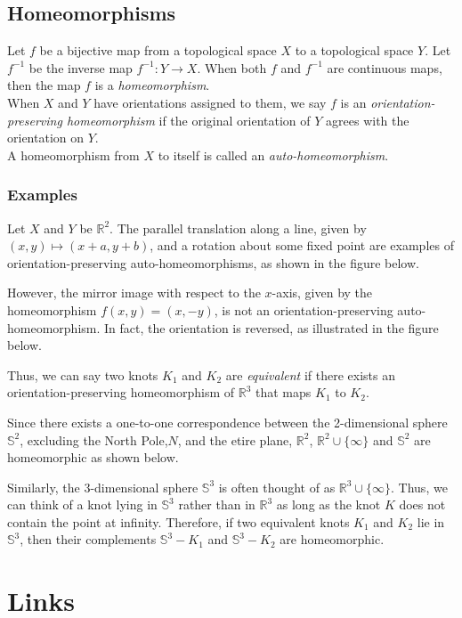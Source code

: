 \documentclass[11pt]{article}
\begin{document}
\subsection{Homeomorphisms}
\label{sec:org5742e76}
Let \(f\) be a bijective map from a topological space \(X\) to a topological space \(Y\). Let \(f^{-1}\) be the inverse map \(f^{-1}: Y \to X\). When both \(f\) and \(f^{-1}\) are continuous maps, then the map \(f\) is a \emph{homeomorphism}.\\[0pt]
When \(X\) and \(Y\) have orientations assigned to them, we say \(f\) is an \emph{orientation-preserving homeomorphism} if the original orientation of \(Y\) agrees with the orientation on \(Y\). \\[0pt]
A homeomorphism from \(X\) to itself is called an \emph{auto-homeomorphism}.
\subsubsection{Examples}
\label{sec:org546c195}
Let \(X\) and \(Y\) be \(\mathbb{R}^2\). The parallel translation along a line, given by \((x, y) \mapsto (x + a, y + b)\), and a rotation about some fixed point  are examples of orientation-preserving auto-homeomorphisms, as shown in the figure below.

However, the mirror image with respect to the \(x\)-axis, given by the homeomorphism \(f(x, y) = (x, -y)\), is not an orientation-preserving auto-homeomorphism. In fact, the orientation is reversed, as illustrated in the figure below. 


Thus, we can say two knots \(K_1\) and \(K_2\) are \emph{equivalent} if there exists an orientation-preserving homeomorphism of \(\mathbb{R}^3\) that maps \(K_1\) to \(K_2\).

Since there exists a one-to-one correspondence between the 2-dimensional sphere \(\mathbb{S}^2\), excluding the North Pole,\(N\), and the etire plane, \(\mathbb{R}^2\),  \(\mathbb{R}^2 \cup \{\infty\}\) and \(\mathbb{S}^2\) are homeomorphic as shown below.


Similarly, the 3-dimensional sphere \(\mathbb{S}^3\) is often thought of as \(\mathbb{R}^3  \cup \{\infty\}\). Thus, we can think of a knot lying in \(\mathbb{S}^3\) rather than in \(\mathbb{R}^3\) as long as the knot \(K\) does not contain the point at infinity. Therefore, if two equivalent knots \(K_1\) and \(K_2\) lie in \(\mathbb{S}^3\), then their complements \(\mathbb{S}^3 - K_1\) and \(\mathbb{S}^3 - K_2\) are homeomorphic.
\section{Links}
\label{sec:org244dd5e}
\end{document}
